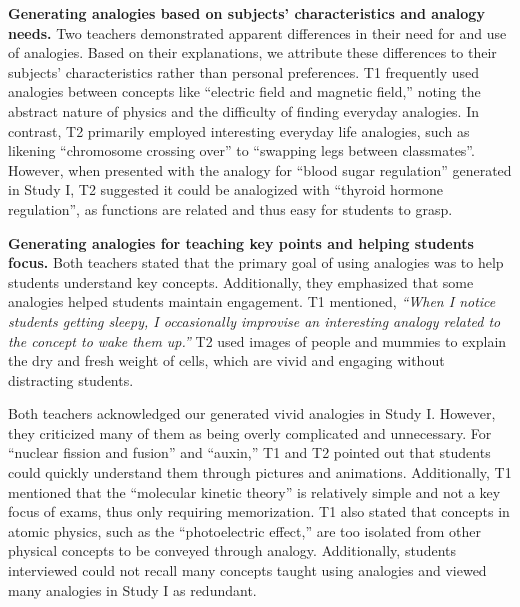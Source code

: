 \textbf{Generating analogies based on subjects' characteristics and analogy needs.}
Two teachers demonstrated apparent differences in their need for and use of analogies. 
Based on their explanations, we attribute these differences to their subjects' characteristics rather than personal preferences. 
T1 frequently used analogies between concepts like ``electric field and magnetic field,'' noting the abstract nature of physics and the difficulty of finding everyday analogies. 
In contrast, T2 primarily employed interesting everyday life analogies, such as likening ``chromosome crossing over'' to ``swapping legs between classmates''. 
However, when presented with the analogy for ``blood sugar regulation'' generated in Study I, T2 suggested it could be analogized with ``thyroid hormone regulation'', as functions are related and thus easy for students to grasp. 


\textbf{Generating analogies for teaching key points and helping students focus.}
Both teachers stated that the primary goal of using analogies was to help students understand key concepts. 
Additionally, they emphasized that some analogies helped students maintain engagement. 
T1 mentioned, \textit{``When I notice students getting sleepy, I occasionally improvise an interesting analogy related to the concept to wake them up.''} 
T2 used images of people and mummies to explain the dry and fresh weight of cells, which are vivid and engaging without distracting students. 



Both teachers acknowledged our generated vivid analogies in Study I. 
However, they criticized many of them as being overly complicated and unnecessary. 
For ``nuclear fission and fusion'' and ``auxin,'' T1 and T2 pointed out that students could quickly understand them through pictures and animations. 
Additionally, T1 mentioned that the ``molecular kinetic theory'' is relatively simple and not a key focus of exams, thus only requiring memorization.
T1 also stated that concepts in atomic physics, such as the ``photoelectric effect,'' are too isolated from other physical concepts to be conveyed through analogy. 
Additionally, students interviewed could not recall many concepts taught using analogies and viewed many analogies in Study I as redundant.

